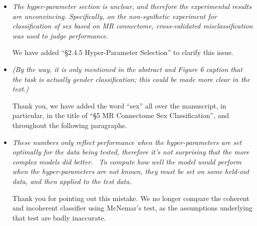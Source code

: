 \begin{itemize}
	
	
	\item \emph{The hyper-parameter section is unclear, and therefore the experimental results are unconvincing. Specifically, on the non-synthetic experiment for classification of sex based on MR connectome, cross-validated misclassification was used to judge performance. }
	
		We have added ``\S 2.4.5 Hyper-Parameter Selection'' to clarify this issue.
	

	
	\item \emph{(By the way, it is only mentioned in the abstract and Figure 6 caption that the task is actually gender classification; this could be made more clear in the text.)   }
	
	Thank you, we have added the word ``sex'' all over the manuscript, in particular, in the title of ``\S 5 MR Connectome Sex Classification'', and throughout the following paragraphs.
	
	\item \emph{These numbers only reflect performance when the hyper-parameters are set optimally for the data being tested, therefore it's not surprising that the more complex models did better.  To compute how well the model would perform when the hyper-parameters are not known, they must be set on some held-out data, and then applied to the test data. } 
	
	Thank you for pointing out this mistake.  We no longer compare the coherent and incoherent classifier using McNemar's test, as the assumptions underlying that test are badly inaccurate. 
	

\end{itemize}
